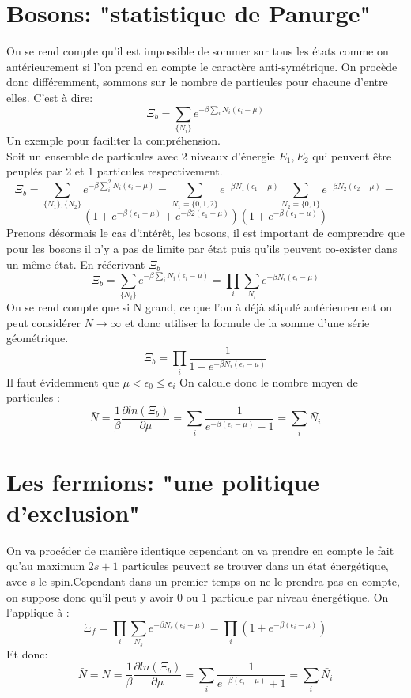 \section{Bosons: "statistique de Panurge"}


On se rend compte qu'il est impossible de sommer sur tous les états comme on antérieurement si l'on prend en compte le caractère anti-symétrique. On procède donc différemment, sommons  sur le nombre de particules pour chacune d'entre elles. C'est à dire:
$$\Xi_b= \sum_{\{N_i\}}e^{-\beta \sum_i N_i (\epsilon_i-\mu)}$$
Un exemple pour faciliter la compréhension. \\
Soit un ensemble de particules avec 2 niveaux d'énergie $E_1,E_2$ qui peuvent être peuplés par 2 et 1 particules respectivement.
$$\Xi_b= \sum_{\{N_1\},\{N_2\}}e^{-\beta \sum_i^2 N_i (\epsilon_i-\mu)}=\sum_{N_1=\{0,1,2\}}e^{-\beta N_1 (\epsilon_1-\mu)}\sum_{N_2=\{0,1\}}e^{-\beta  N_2 (\epsilon_2-\mu)}=$$
$$\left(1+e^{-\beta  (\epsilon_1-\mu)}+e^{-\beta  2(\epsilon_1-\mu)}\right)\left(1+e^{-\beta  (\epsilon_1-\mu)}\right)$$
Prenons désormais le cas d'intérêt, les bosons, il est important de comprendre que pour les bosons il n'y a pas de limite par état puis qu'ils peuvent co-exister dans un même état. En réécrivant $\Xi_b$
$$\Xi_b= \sum_{\{N_i\}}e^{-\beta \sum_i N_i (\epsilon_i-\mu)}=\prod_i\sum_{N_i}e^{-\beta N_i (\epsilon_i-\mu)}$$
On se rend compte que si N grand, ce que l'on à déjà stipulé antérieurement on peut considérer $N\rightarrow\infty$ et donc utiliser la formule de la somme d'une série géométrique.
$$\Xi_b=\prod_i\frac{1}{1-e^{-\beta N_i (\epsilon_i-\mu)}}$$
Il faut évidemment que $\mu < \epsilon_0\leq \epsilon_i$
On calcule donc le nombre moyen de particules :
$$\bar{N}=\frac{1}{\beta}\frac{\partial ln(\Xi_b)}{\partial \mu}=\sum_i \frac{1}{e^{-\beta (\epsilon_i-\mu)}-1}=\sum_i\bar{N_i}$$


\section{Les fermions: "une politique d'exclusion"}


On va procéder de manière identique cependant on va prendre en compte le fait qu'au maximum $2s+1$ particules peuvent se trouver dans un état énergétique, avec s le spin.Cependant dans un premier temps on ne le prendra pas en compte, on suppose donc qu'il peut y avoir 0 ou 1 particule par niveau énergétique.
On l'applique à :
$$\Xi_f=\prod_i\sum_{N_s}e^{-\beta N_s (\epsilon_i-\mu)}=\prod_i\left(1+e^{-\beta  (\epsilon_i-\mu)}\right)$$
Et donc:
$$\bar{N}=N=\frac{1}{\beta}\frac{\partial ln(\Xi_b)}{\partial \mu}=\sum_i \frac{1}{e^{-\beta (\epsilon_i-\mu)}+1}=\sum_i\bar{N_i}$$


